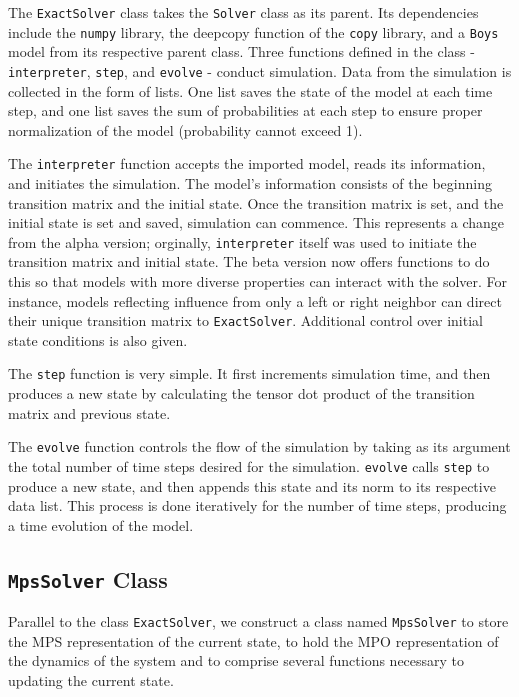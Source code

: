 \documentclass[english]{article}[12pt]
\begin{document}
The \texttt{ExactSolver} class takes the \texttt{Solver} class as its parent. Its dependencies include the \texttt{numpy} library, the deepcopy function of the \texttt{copy} library, and a \texttt{Boys} model from its respective parent class. Three functions defined in the class - \texttt{interpreter}, \texttt{step}, and \texttt{evolve} - conduct simulation. Data from the simulation is collected in the form of lists. One list saves the state of the model at each time step, and one list saves the sum of probabilities at each step to ensure proper normalization of the model (probability cannot exceed 1).

The \texttt{interpreter} function accepts the imported model, reads its information, and initiates the simulation. The model's information consists of the beginning transition matrix and the initial state. Once the transition matrix is set, and the initial state is set and saved, simulation can commence. This represents a change from the alpha version; orginally, \texttt{interpreter} itself was used to initiate the transition matrix and initial state. The beta version now offers functions to do this so that models with more diverse properties can interact with the solver. For instance, models reflecting influence from only a left or right neighbor can direct their unique transition matrix to \texttt{ExactSolver}. Additional control over initial state conditions is also given.

The \texttt{step} function is very simple. It first increments simulation time, and then produces a new state by calculating the tensor dot product of the transition matrix and previous state.

The \texttt{evolve} function controls the flow of the simulation by taking as its argument the total number of time steps desired for the simulation. \texttt{evolve} calls \texttt{step} to produce a new state, and then appends this state and its norm to its respective data list. This process is done iteratively for the number of time steps, producing a time evolution of the model. 


\subsection{\texttt{MpsSolver} Class}
Parallel to the class \texttt{ExactSolver}, we construct a class named \texttt{MpsSolver} to store the MPS representation of the current state, to hold the MPO representation of the dynamics of the system and to comprise several functions necessary to updating the current state. 
\end{document}

